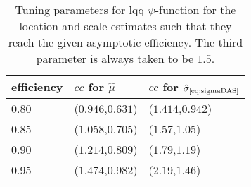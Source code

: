 \begin{table}[htbp!]
\begin{center}
{\small
\begin{tabular}{lll}
  \hline
efficiency & $cc$ for $\hat\mu$ & $cc$ for $\hat\sigma_\text{\eqref{eq:sigmaDAS}}$ \\ 
  \hline
0.80 & ($0.946$,$0.631$) & ($1.414$,$0.942$) \\ 
  0.85 & ($1.058$,$0.705$) & ($1.57$,$1.05$) \\ 
  0.90 & ($1.214$,$0.809$) & ($1.79$,$1.19$) \\ 
  0.95 & ($1.474$,$0.982$) & ($2.19$,$1.46$) \\ 
   \hline
\end{tabular}
}
\caption{Tuning parameters for lqq $\psi$-function for the location and scale estimates such that they reach the given asymptotic efficiency. The third parameter is always taken to be $1.5$.}
\label{tab:eqqLqqLocationScale}
\end{center}
\end{table}
